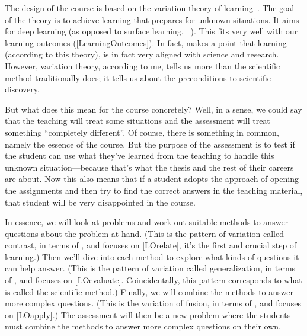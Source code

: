 \begin{frame}
\begin{remark}
\begin{columns}[T]
\begin{column}{0.4\columnwidth}
        \end{column}
      \end{columns}
  \end{remark}
\end{frame}

The design of the course is based on the variation theory of learning~\cite[see 
\eg][]{NecessaryConditionsOfLearning}.
The goal of the theory is to achieve learning that prepares for unknown 
situations.
It aims for deep learning (as opposed to surface learning, 
\cf~\cite{DeepSurfaceLearning}).
This fits very well with our learning outcomes (\cref{LearningOutcomes}).
In fact, \textcite{NecessaryConditionsOfLearning} makes a point that learning 
(according to this theory), is in fact very aligned with science and research.
However, variation theory, according to me, tells us more than the scientific 
method traditionally does; it tells us about the preconditions to scientific 
discovery.

But what does this mean for the course concretely?
Well, in a sense, we could say that the teaching will treat some situations and 
the assessment will treat something \enquote{completely different}.
Of course, there is something in common, namely the essence of the course.
But the purpose of the assessment is to test if the student can use what 
they've learned from the teaching to handle this unknown situation---because 
that's what the thesis and the rest of their careers are about.
Now this also means that if a student adopts the approach of opening the 
assignments and then try to find the correct answers in the teaching material, 
that student will be very disappointed in the course.

In essence, we will look at problems and work out suitable methods to answer 
questions about the problem at hand.
(This is the pattern of variation called contrast, in terms of 
\cite{NecessaryConditionsOfLearning}, and focuses on \ref{LOrelate}, it's the 
first and crucial step of learning.)
Then we'll dive into each method to explore what kinds of questions it can help 
answer.
(This is the pattern of variation called generalization, in terms of 
\cite{NecessaryConditionsOfLearning}, and focuses on \ref{LOevaluate}.
Coincidentally, this pattern corresponds to what is called the scientific 
method.)
Finally, we will combine the methods to answer more complex questions.
(This is the variation of fusion, in terms of 
\cite{NecessaryConditionsOfLearning}, and focuses on \ref{LOapply}.)
The assessment will then be a new problem where the students must combine the 
methods to answer more complex questions on their own.

